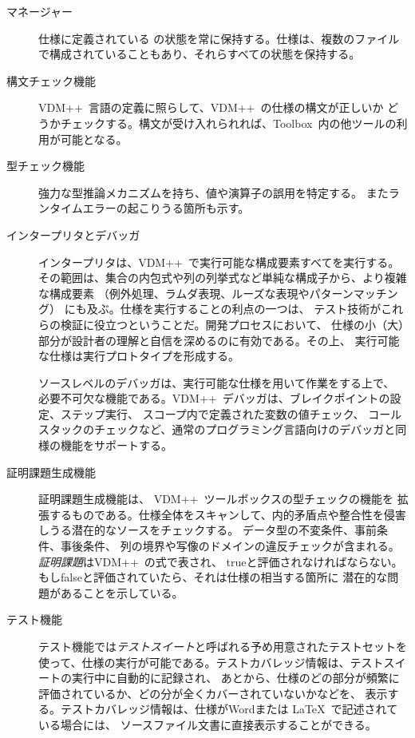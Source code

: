 \documentclass[\pformat,12pt]{jarticle}
\newcommand{\vdmslpp}{VDM++}
\newcommand{\Toolbox}{Toolbox}
\begin{document}
\begin{description}
  

\item[マネージャー] 仕様に定義されている
の状態を常に保持する。仕様は、複数のファイルで構成されていることもあり、それらすべての状態を保持する。

\item[構文チェック機能] \vdmslpp\ 言語の定義に照らして、\vdmslpp\ の仕様の構文が正しいか
どうかチェックする。構文が受け入れられれば、\Toolbox\ 内の他ツールの利用が可能となる。

\item[型チェック機能] 強力な型推論メカニズムを持ち、値や演算子の誤用を特定する。
またランタイムエラーの起こりうる箇所も示す。

\item[インタープリタとデバッガ] インタープリタは、\vdmslpp\ で実行可能な構成要素すべてを実行する。
その範囲は、集合の内包式や列の列挙式など単純な構成子から、より複雑な構成要素
（例外処理、ラムダ表現、ルーズな表現やパターンマッチング）
にも及ぶ。仕様を実行することの利点の一つは、
テスト技術がこれらの検証に役立つということだ。開発プロセスにおいて、
仕様の小（大）部分が設計者の理解と自信を深めるのに有効である。その上、
実行可能な仕様は実行プロトタイプを形成する。

ソースレベルのデバッガは、実行可能な仕様を用いて作業をする上で、
必要不可欠な機能である。\vdmslpp\ デバッガは、ブレイクポイントの設定、ステップ実行、
スコープ内で定義された変数の値チェック、
コールスタックのチェックなど、通常のプログラミング言語向けのデバッガと同様の機能をサポートする。

\item[証明課題生成機能] 証明課題生成機能は、 \vdmslpp\ ツールボックスの型チェックの機能を
拡張するものである。仕様全体をスキャンして、内的矛盾点や整合性を侵害しうる潜在的なソースをチェックする。
データ型の不変条件、事前条件、事後条件、
列の境界や写像のドメインの違反チェックが含まれる。\emph{証明課題}は\vdmslpp\ の式で表され、
trueと評価されなければならない。もしfalseと評価されていたら、それは仕様の相当する箇所に
潜在的な問題があることを示している。

\item[テスト機能] テスト機能では{\em テストスイート\/}と呼ばれる予め用意されたテストセットを
使って、仕様の実行が可能である。テストカバレッジ情報は、テストスイートの実行中に自動的に記録され、
あとから、仕様のどの部分が頻繁に評価されているか、どの分が全くカバーされていないかなどを、
表示する。テストカバレッジ情報は、仕様がWordまたは \LaTeX\ で記述されている場合には、
ソースファイル文書に直接表示することができる。


\end{description}
\end{document}
